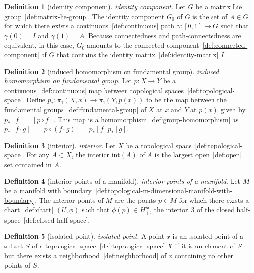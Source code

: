 \documentclass[12pt,a4paper]{article}
\theoremstyle{definition}
\newtheorem{definition}{Definition}
\begin{document}
\begin{definition}[identity component]\label{def:identity-component}
\emph{identity component}. Let $G$ be a matrix Lie group~\ref{def:matrix-lie-group}. The identity component $G_0$ of $G$ is the set of $A\in G$ for which there exists a continuous~\ref{def:continuous} path $\gamma:[0,1]\to G$ such that $\gamma(0) = I$ and $\gamma(1) = A$. Because connectedness and path-connectedness are equivalent, in this case, $G_0$ amounts to the connected component~\ref{def:connected-component} of $G$ that contains the identity matrix~\ref{def:identity-matrix} $I$.
\end{definition}

\begin{definition}[induced homomorphism on fundamental group]\label{def:induced-homomorphism-on-fundamental-group}
\emph{induced homomorphism on fundamental group}. Let $p:X\to Y$ be a continuous~\ref{def:continuous} map between topological spaces~\ref{def:topological-space}. Define $p_*:\pi_1(X,x) \to \pi_1(Y,p(x))$ to be the map between the fundamental groups~\ref{def:fundamental-group} of $X$ at $x$ and $Y$ at $p(x)$ given by $p_*[f] = [p\circ f]$. This map is a homomorphism~\ref{def:group-homomorphism} as $p_*[f\cdot g] = [p\circ (f\cdot g)] = p_*[f]p_*[g]$.
\end{definition}

\begin{definition}[interior]\label{def:interior}
\emph{interior}. Let $X$ be a topological space~\ref{def:topological-space}. For any $A\subset X$, the interior $\text{int}(A)$ of $A$ is the largest open~\ref{def:open} set contained in $A$.
\end{definition}

\begin{definition}[interior points of a manifold]\label{def:interior-points-of-a-manifold}
\emph{interior points of a manifold}. Let $M$ be a manifold with boundary~\ref{def:topological-m-dimensional-manifold-with-boundary}. The interior points of $M$ are the points $p\in M$ for which there exists a chart~\ref{def:chart} $(U,\phi)$ such that $\phi(p) \in H^m_+$, the interior~\ref{def:interior} of the closed half-space~\ref{def:closed-half-space}.
\end{definition}

\begin{definition}[isolated point]\label{def:isolated-point}
\emph{isolated point}. A point $x$ is an isolated point of a subset $S$ of a topological space~\ref{def:topological-space} $X$ if it is an element of $S$ but there exists a neighborhood~\ref{def:neighborhood} of $x$ containing no other points of $S$.
\end{definition}
\end{document}
